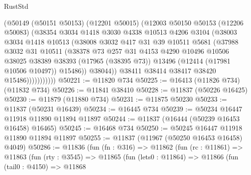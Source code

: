 \begin{lexlean}{RustStd}
\begin{coremodule}
                    (@50149
                      (@50151 @50153)
                      (@12201 @50015)
                      (@12003
                        @50150
                        @50153
                        (@12206 @50083)
                        (@38354
                          @3034
                          @1418
                          @3030
                          @4338
                          @10513
                          @4206
                          @3104
                          (@38003
                            @3034
                            @1418
                            @10513
                            (@38008
                              @3032
                              @417
                              @31
                              @39
                              @10511
                              @5681
                              (@37988
                                @3032
                                @31
                                @10511
                                (@38378
                                  @73
                                  @257
                                  @31
                                  @4153
                                  @4290
                                  @10496
                                  @10506
                                  @38025
                                  @38389
                                  @38393
                                  (@17965 (@38395 @73))
                                  @13496
                                  (@12414 (@17981 @10506 @10497))
                                  @15486))
                              @38044))
                          @38411
                          @38414
                          @38417
                          @38420
                          @15486)))))))))))
@50221 := @11820 @734
@50225 := @16413 (@11826 @734) (@11832 @734)
@50226 := @11841 @38410
@50228 := @11837 (@50226 @16425)
@50230 := @11879 (@11880 @734)
@50231 := @11875 @50230
@50233 := @11837 (@50231 @16439)
@50234 := @16445 @734
@50239 := @50234 @16447 @11918 @11890 @11894 @11897
@50244 := @11837 (@16444 (@50239 @16453 @16458) @16465)
@50245 := @16468 @734
@50250 := @50245 @16447 @11918 @11890 @11894 @11897
@50255 := @11837 (@11967 (@50250 @16453 @16458) @4049)
@50286 := @11836
    (fun (fn : @316) =>
    @11862
      (fun (rc : @11861) =>
      @11863
        (fun (rty : @3545) =>
        @11865
          (fun (lets0 : @11864) =>
          @11866
            (fun (tail0 : @4150) =>
            @11868

\end{coremodule}
\end{lexlean}
